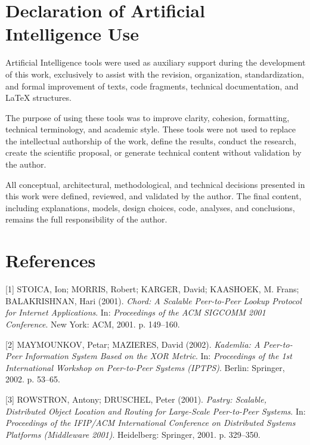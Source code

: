 \documentclass[12pt]{article}
\begin{document}
\section*{Declaration of Artificial Intelligence Use}

Artificial Intelligence tools were used as auxiliary support during the development
of this work, exclusively to assist with the revision, organization, standardization,
and formal improvement of texts, code fragments, technical documentation, and
\LaTeX{} structures.

The purpose of using these tools was to improve clarity, cohesion, formatting,
technical terminology, and academic style. These tools were not used to replace the
intellectual authorship of the work, define the results, conduct the research, create
the scientific proposal, or generate technical content without validation by the
author.

All conceptual, architectural, methodological, and technical decisions presented in
this work were defined, reviewed, and validated by the author. The final content,
including explanations, models, design choices, code, analyses, and conclusions,
remains the full responsibility of the author.





\section*{References}
\begingroup
\setlength{\leftskip}{0.5cm}
\setlength{\parindent}{-0.5cm}
\setlength{\parskip}{6pt}

[1] STOICA, Ion; MORRIS, Robert; KARGER, David; KAASHOEK, M. Frans; BALAKRISHNAN, Hari (2001). 
\textit{Chord: A Scalable Peer-to-Peer Lookup Protocol for Internet Applications}. 
In: \textit{Proceedings of the ACM SIGCOMM 2001 Conference}. 
New York: ACM, 2001. p. 149--160.

[2] MAYMOUNKOV, Petar; MAZIERES, David (2002). 
\textit{Kademlia: A Peer-to-Peer Information System Based on the XOR Metric}. 
In: \textit{Proceedings of the 1st International Workshop on Peer-to-Peer Systems (IPTPS)}. 
Berlin: Springer, 2002. p. 53--65.

[3] ROWSTRON, Antony; DRUSCHEL, Peter (2001). 
\textit{Pastry: Scalable, Distributed Object Location and Routing for Large-Scale Peer-to-Peer Systems}. 
In: \textit{Proceedings of the IFIP/ACM International Conference on Distributed Systems Platforms (Middleware 2001)}. 
Heidelberg: Springer, 2001. p. 329--350.
\end{document}
